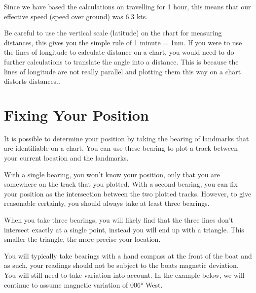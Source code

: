\documentclass[a4paper,10pt,oneside]{book}
\begin{document}
Since we have based the calculations on travelling for 1 hour, this means that our effective speed (speed over ground) was 6.3 kts.

\vspace{10pt}
\begin{center}
	\begin{tcolorbox}[
		colback=gray!10,      %
		colframe=black,       %
		boxrule=0.5pt,        %
		arc=0pt,               %
		left=4pt, right=4pt, top=4pt, bottom=4pt,
		width=0.8\linewidth,
		]
		Be careful to use the vertical scale (latitude) on the chart for measuring distances, this gives you the simple rule of 1 minute = 1nm. If you were to use the lines of longitude to calculate distance on a chart, you would need to do further calculations to translate the angle into a distance. This is because the lines of longitude are not really parallel and plotting them this way on a chart distorts distances..
	\end{tcolorbox}
\end{center}

\vspace{20pt}


\newpage
\section{Fixing Your Position}
It is possible to determine your position by taking the bearing of landmarks that are identifiable on a chart. You can use these bearing to plot a track between your current location and the landmarks. 

With a single bearing, you won’t know your position, only that you are somewhere on the track that you plotted. With a second bearing, you can fix your position as the intersection between the two plotted tracks. However, to give reasonable certainty, you should always take at least three bearings. 

When you take three bearings, you will likely find that the three lines don’t intersect exactly at a single point, instead you will end up with a triangle. This smaller the triangle, the more precise your location.

You will typically take bearings with a hand compass at the front of the boat and as such, your readings should  not be subject to the boats magnetic deviation. You will still need to take variation into account. In the example below, we will continue to assume magnetic variation of 006° West.
\end{document}
